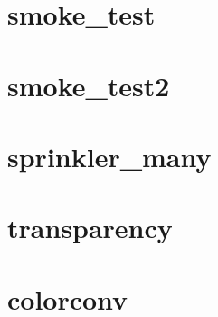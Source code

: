 \documentclass[11pt,twoside]{book}
\newcommand{\fdsinput}[1]{
{
\scriptsize

}
}
\begin{document}
\section{smoke\_test}
\label{SSFsmoketest}
\fdsinput{smoke_test.ssf}

\section{smoke\_test2}
\label{SSFsmoketest2}
\fdsinput{smoke_test2.ssf}

\section{sprinkler\_many}
\label{SSFspinklermany}
\fdsinput{sprinkler_many.ssf}

\section{transparency}
\label{SSFtransparency}
\fdsinput{transparency.ssf}

\section{colorconv}
\label{SSFcolorconv}
\fdsinput{colorconv.ssf}
\end{document}

